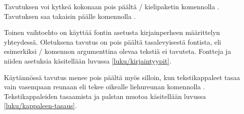 Tavutuksen voi kytkeä kokonaan pois päältä \-/
kielipaketin komennolla . Tavutuksen saa
takaisin päälle komennolla .

Toinen vaihtoehto on käyttää fontin asetusta  kirjainperheen määrittelyn yhteydessä. Oletuksena tavutus on
pois päältä tasalevyisestä fontista, eli esimerkiksi \-/
komennon argumenttina olevaa tekstiä ei tavuteta. Fontteja ja niiden
asetuksia käsitellään luvussa \ref{luku/kirjaintyypit}.

Käytännössä tavutus menee pois päältä myös silloin, kun tekstikappaleet
tasaa vain vasempaan reunaan eli tekee oikealle liehureunan komennolla
. Tekstikappaleiden tasaamista ja palstan muotoa
käsitellään luvussa \ref{luku/kappaleen-tasaus}.
